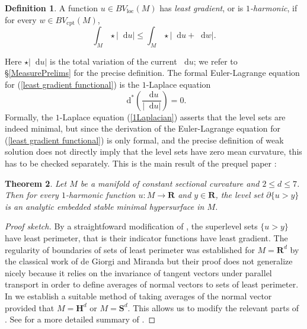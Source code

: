 \documentclass[reqno,11pt]{amsart}
\newcommand{\RR}{\mathbf{R}}
\newcommand{\Hyp}{\mathbf H}
\newcommand{\Sph}{\mathbf S}
\newcommand*\dif{\mathop{}\!\mathrm{d}}
\newcommand{\dfn}[1]{\emph{#1}\index{#1}}
\newcommand{\loc}{\mathrm{loc}}
\newcommand{\cpt}{\mathrm{cpt}}
\newtheorem{theorem}{Theorem}[section]
\theoremstyle{definition}
\newtheorem{definition}[theorem]{Definition}
\numberwithin{equation}{section}
\begin{document}
\begin{definition}
A function $u \in BV_\loc(M)$ has \dfn{least gradient}, or is \dfn{$1$-harmonic}, if for every $w \in BV_\cpt(M)$,
\begin{equation}\label{least gradient functional}
\int_M \star |\dif u| \leq \int_M \star |\dif u + \dif w|.
\end{equation}
\end{definition}

Here $\star |\dif u|$ is the total variation of the current $\dif u$; we refer to \S\ref{MeasurePrelims} for the precise definition.
The formal Euler-Lagrange equation for (\ref{least gradient functional}) is the $1$-Laplace equation
\begin{equation}\label{1Laplacian}
\dif^* \left(\frac{\dif u}{|\dif u|}\right) = 0.
\end{equation}
Formally, the $1$-Laplace equation (\ref{1Laplacian}) asserts that the level sets are indeed minimal, but since the derivation of the Euler-Lagrange equation for (\ref{least gradient functional}) is only formal, and the precise definition of weak solution \cite{Mazon14} does not directly imply that the level sets have zero mean curvature, this has to be checked separately.
This is the main result of the prequel paper \cite{BackusFLG}:

\begin{theorem}\label{main thm of old paper}
Let $M$ be a manifold of constant sectional curvature and $2 \leq d \leq 7$.
Then for every $1$-harmonic function $u: M \to \RR$ and $y \in \RR$, the level set $\partial \{u > y\}$ is an analytic embedded stable minimal hypersurface in $M$.
\end{theorem}
\begin{proof}[Proof sketch]
By a straightfoward modification of \cite[Theorem 1]{BOMBIERI1969}, the superlevel sets $\{u > y\}$ have least perimeter, that is their indicator functions have least gradient.
The regularity of boundaries of sets of least perimeter was established for $M = \RR^d$ by the classical work of de Giorgi and Miranda \cite{deGiorgi61, Miranda66} but their proof does not generalize nicely because it relies on the invariance of tangent vectors under parallel transport in order to define averages of normal vectors to sets of least perimeter.
In \cite[\S3]{BackusFLG} we establish a suitable method of taking averages of the normal vector provided that $M = \Hyp^d$ or $M = \Sph^d$.
This allows us to modify the relevant parts of \cite{Miranda66}.
See \cite[\S1]{BackusFLG} for a more detailed summary of \cite{BackusFLG}.
\end{proof}
\end{document}
